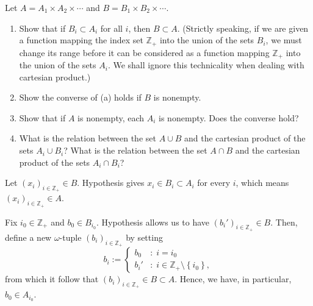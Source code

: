 \documentclass[a4paper,12pt]{article}
\begin{document}
\begin{exe}
	Let \( A=A_1 \times A_2 \times \cdots \)
	and
	\( B = B_1 \times B_2 \times \cdots \).
	\begin{enumerate}
		\item
		      Show that if \( B_i \subset A_i \) for all \( i \),
		      then \( B \subset A \).
		      (Strictly speaking,
		      if we are given a function mapping the index set \( \mathbb{Z}_{+} \) into the union of the sets \( B_i \),
		      we must change its range before it can be considered as a function mapping
		      \( \mathbb{Z}_{+} \) into the union of the sets \( A_i \).
		      We shall ignore this technicality when dealing with cartesian product.)
		      
		\item
		      Show the converse of (a) holds if \( B\) is nonempty.
		      
		\item
		      Show that if \( A \) is nonempty, each \( A_i \) is nonempty.
		      Does the converse hold?
		      
		\item
		      What is the relation between the set \( A\cup B \)
		      and the cartesian product of the sets \( A_i \cup B_i \)?
		      What is the relation between the set \( A\cap B \) and the cartesian product of the sets \( A_i \cap B_i \)?
	\end{enumerate}
\end{exe}\begin{sol}\leavevmode \par
	Let 
	\( \left( x_i \right)_{i \in \mathbb{Z}_{+}}\in B \).
	Hypothesis gives 
	\( x_i \in B_i \subset A_i \)
	for every
	\( i \),
	which means
	\( \left( x_i \right)_{i \in \mathbb{Z}_{+}}\in A \).
	
	Fix \( i_0 \in \mathbb{Z}_{+} \)
	and
	\( b_0 \in B_{i_0} \).
	Hypothesis allows us to have
	\( \left( b_i' \right)_{i \in \mathbb{Z}_{+}} \in B\).
	Then, define a new \( \omega \)-tuple 
	\( (b_i)_{i \in \mathbb{Z}_{+}}\) by setting
	\begin{equation*}
		b_{i} := 
		\begin{cases}
			b_0				
			 & \mathrm{\colon\;} i = i_0 \\
			b_{i}'
			 & \mathrm{\colon\;}
			i \in \mathbb{Z}_{+} \setminus \left\{ i_0 \right\},
		\end{cases}
	\end{equation*}
	from which it follow that
	\( (b_i)_{i \in \mathbb{Z}_{+}} \in B \subset A\).
	Hence, we have, in particular,
	\( b_0 \in A_{i_0} \).
	

\end{sol}
\end{document}
